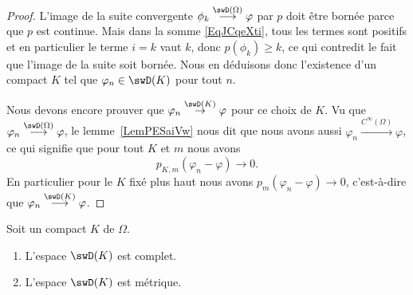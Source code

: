 \begin{proof}
	L'image de la suite convergente \( \phi_k\stackrel{\swD(\Omega)}{\longrightarrow}\varphi\) par \( p\) doit être bornée parce que \( p\) est continue. Mais dans la somme  \eqref{EqJCqeXti}, tous les termes sont positifs et en particulier le terme \( i=k\) vaut \( k\), donc \( p(\phi_k)\geq k\), ce qui contredit le fait que l'image de la suite soit bornée. Nous en déduisons donc l'existence d'un compact \( K\) tel que \( \varphi_n\in \swD(K)\) pour tout \( n\).

	Nous devons encore prouver que \( \varphi_n\stackrel{\swD(K)}{\to}\varphi\) pour ce choix de \( K\). Vu que \( \varphi_n\stackrel{\swD(\Omega)}{\longrightarrow}\varphi\), le lemme~\ref{LemPESaiVw} nous dit que nous avons aussi \( \varphi_n\stackrel{ C^{\infty}(\Omega)}{\longrightarrow}\varphi\), ce qui signifie que pour tout \( K\) et \( m\) nous avons
	\begin{equation}
		p_{K,m}(\varphi_n-\varphi)\to 0.
	\end{equation}
	En particulier pour le \( K\) fixé plus haut nous avons \( p_m(\varphi_n-\varphi)\to 0\), c'est-à-dire que \( \varphi_n\stackrel{\swD(K)}{\longrightarrow}\varphi\).

\end{proof}


\begin{proposition} \label{PropQAEVcTi}
	Soit un compact \( K\) de \( \Omega\).
	\begin{enumerate}
		\item
		      L'espace \( \swD(K)\) est complet.
		\item
		      L'espace \( \swD(K)\) est métrique.
	\end{enumerate}
\end{proposition}

